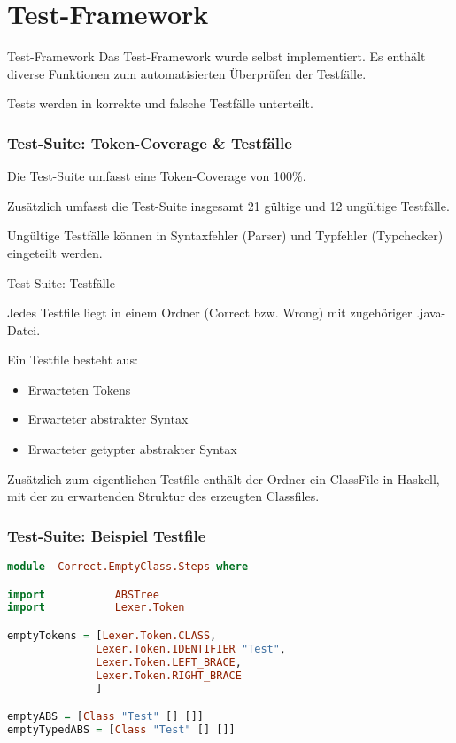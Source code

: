 \section{Test-Framework}

\begin{frame}{Test-Framework}
Das Test-Framework wurde selbst implementiert. Es enthält diverse Funktionen zum automatisierten Überprüfen der Testfälle.

\par \medskip

Tests werden in korrekte und falsche Testfälle unterteilt.


\end{frame}

\begin{frame}[fragile]
	\frametitle{Test-Suite: Token-Coverage \& Testfälle}
	
Die Test-Suite umfasst eine Token-Coverage von 100\%. 

\par \medskip

Zusätzlich umfasst die Test-Suite insgesamt 21 gültige und 12 ungültige Testfälle.

\par \medskip

Ungültige Testfälle können in Syntaxfehler (Parser) und Typfehler (Typchecker) eingeteilt werden.
\end{frame}

\begin{frame}{Test-Suite: Testfälle}

Jedes Testfile liegt in einem Ordner (Correct bzw. Wrong) mit zugehöriger .java-Datei. 	

\par \medskip

Ein Testfile besteht aus: 

\begin{itemize}
	\item Erwarteten Tokens
	\item Erwarteter abstrakter Syntax
	\item Erwarteter getypter abstrakter Syntax
\end{itemize}

Zusätzlich zum eigentlichen Testfile enthält der Ordner ein ClassFile in Haskell, mit der zu erwartenden Struktur des erzeugten Classfiles.
\end{frame}

\begin{frame}[fragile]
\frametitle{Test-Suite: Beispiel Testfile}
\begin{lstlisting}[language=Haskell]
module  Correct.EmptyClass.Steps where

import           ABSTree
import           Lexer.Token

emptyTokens = [Lexer.Token.CLASS,
              Lexer.Token.IDENTIFIER "Test",
              Lexer.Token.LEFT_BRACE,
              Lexer.Token.RIGHT_BRACE
              ]

emptyABS = [Class "Test" [] []]
emptyTypedABS = [Class "Test" [] []]	
\end{lstlisting}
	
\end{frame}

